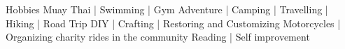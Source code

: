 


\begin{cvskills}

  \cvskill
  {Hobbies}
  {Muay Thai | Swimming | Gym}
  {Adventure | Camping | Travelling | Hiking | Road Trip}
  {DIY | Crafting | Restoring and Customizing Motorcycles | Organizing charity rides in the community}
  {Reading | Self improvement}



\end{cvskills}